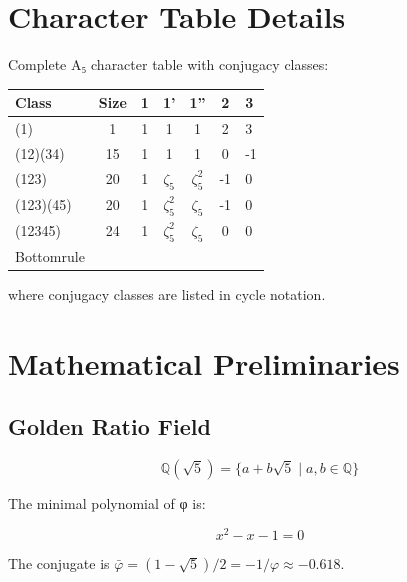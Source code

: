 \documentclass{article}
\begin{document}
\appendix

\section{Character Table Details}

Complete A₅ character table with conjugacy classes:

\begin{table}[h]
\centering
\begin{tabular}{lccccc}
\toprule
Class & Size & 1 & 1' & 1'' & 2 & 3 \\
\midrule
(1) & 1 & 1 & 1 & 1 & 2 & 3 \\
(12)(34) & 15 & 1 & 1 & 1 & 0 & -1 \\
(123) & 20 & 1 & $\zeta_5$ & $\zeta_5^2$ & -1 & 0 \\
(123)(45) & 20 & 1 & $\zeta_5^2$ & $\zeta_5$ & -1 & 0 \\
(12345) & 24 & 1 & $\zeta_5^2$ & $\zeta_5$ & 0 & 0 \\
Bottomrule
\end{tabular}
\end{table}

where conjugacy classes are listed in cycle notation.

\section{Mathematical Preliminaries}

\subsection{Golden Ratio Field}

\[
\mathbb{Q}(\sqrt{5}) = \{a + b\sqrt{5} \mid a, b \in \mathbb{Q}\}
\]

The minimal polynomial of φ is:

\[
x^2 - x - 1 = 0
\]

The conjugate is $\bar{\varphi} = (1-\sqrt{5})/2 = -1/\varphi \approx -0.618$.
\end{document}
